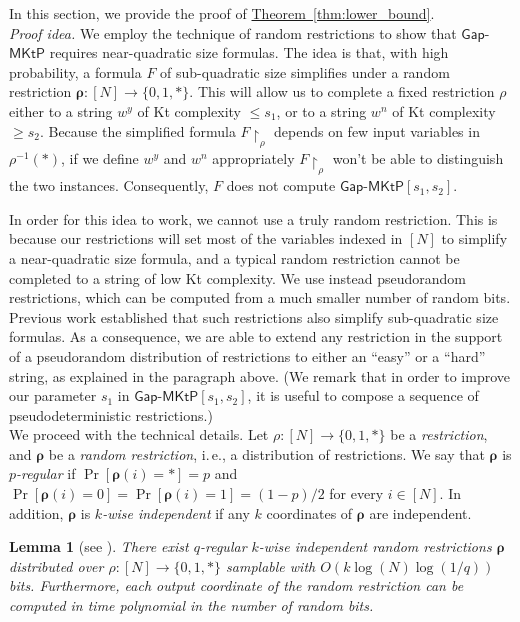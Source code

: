 \documentclass[11pt]{article}
\numberwithin{equation}{section}
\newtheorem{lemma}[theorem]{Lemma}
\theoremstyle{definition}
\theoremstyle{plain}
\newcommand{\ie}{i.\,e.}
\newcommand{\expref}[2]{\hyperref[#2]{#1~\ref{#2}}}
\newcommand{\gapmktp}{\mathsf{Gap}$-$\mathsf{MKtP}}
\begin{document}
In this section, we provide the proof of \expref{Theorem}{thm:lower_bound}.\\ 

\noindent \emph{Proof idea.} We employ the technique of random restrictions to show that $\gapmktp$ requires near-quadratic size formulas. The idea is that, with high probability, a formula $F$ of sub-quadratic size simplifies under a random restriction $\bm{\rho} \colon [N] \to \{0,1,*\}$. This will allow us to complete a fixed restriction $\rho$ either to a string $w^y$ of Kt complexity $\leq s_1$, or to a string $w^n$ of Kt complexity $\geq s_2$. Because the simplified formula $F\!\upharpoonright_\rho$ depends on few input variables in $\rho^{-1}(*)$, if we define $w^y$ and $w^n$ appropriately $F\!\upharpoonright_\rho$ won't be able to distinguish the two instances. Consequently, $F$ does not compute $\gapmktp[s_1, s_2]$.

In order for this idea to work, we cannot use a truly random restriction. This is because our restrictions will set most of the variables indexed in $[N]$ to simplify a near-quadratic size formula, and a typical random restriction cannot be completed to a string of low Kt complexity. We use instead pseudorandom restrictions, which can be computed from a much  smaller number of random bits. Previous work established that such restrictions also simplify sub-quadratic size formulas. As a consequence, we are able to extend any restriction in the support of a pseudorandom distribution of restrictions to either an ``easy'' or a ``hard'' string, as explained in the paragraph above. (We remark that in order to improve our parameter $s_1$ in $\gapmktp[s_1,s_2]$, it is useful to compose a sequence of pseudodeterministic restrictions.)\\



We proceed with the technical details. Let $\rho \colon [N] \to \{0,1,*\}$ be a \emph{restriction}, and $\bm{\rho}$ be a \emph{random restriction}, \ie, a distribution of restrictions. We say that $\bm{\rho}$ is $p$\emph{-regular} if $\Pr[\bm{\rho}(i) = *] = p$ and $\Pr[\bm{\rho}(i) = 0] = \Pr[\bm{\rho}(i) = 1] = (1-p)/2$ for every $i \in [N]$. In addition, $\bm{\rho}$ is $k$\emph{-wise independent} if any $k$ coordinates of $\bm{\rho}$ are independent. 

\begin{lemma}[see \cite{DBLP:conf/focs/ImpagliazzoMZ12, DBLP:journals/fttcs/Vadhan12}] \label{l:complexity_restriction}
There exist  $q$-regular $k$-wise independent random restrictions $\bm{\rho}$ distributed over $\rho \colon [N] \to \{0,1,*\}$ samplable with $O(k \log (N) \log (1/q))$ bits. Furthermore, each output coordinate of the random restriction can be computed in time polynomial in the number of random bits. 
\end{lemma}
\end{document}
